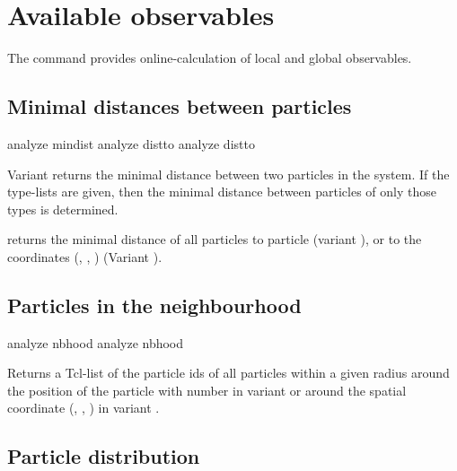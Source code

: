 \section{Available observables}

The command  provides online-calculation of local and
global observables. 

\subsection{Minimal distances between particles}
\label{analyze:mindist}
\label{analyze:distto}

\begin{essyntax}
   analyze mindist 
   analyze distto 
   analyze distto   
\end{essyntax}

Variant  returns the minimal distance between two particles
in the system. If the type-lists are given, then the minimal distance
between particles of only those types is determined.

 returns the minimal distance of all particles to
particle  (variant ), or to the coordinates
(, , ) (Variant ).

\subsection{Particles in the neighbourhood}
\label{analyze:nbhood}

\begin{essyntax}
  analyze nbhood  
  analyze nbhood   
\end{essyntax}
Returns a Tcl-list of the particle ids of all particles within a given
radius  around the position of the particle with number
 in variant  or around the spatial coordinate
(, , ) in variant .

\subsection{Particle distribution}
\label{analyze:distribution}

